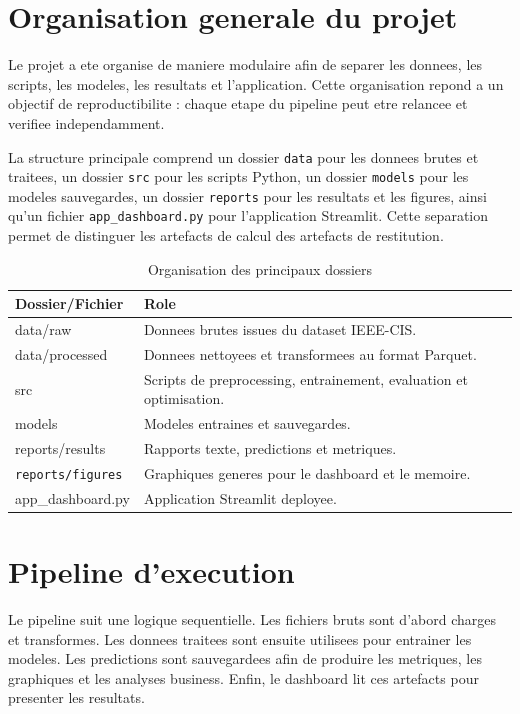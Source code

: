 ﻿\documentclass[12pt,a4paper,oneside]{report}
\begin{document}
\section{Organisation generale du projet}

Le projet a ete organise de maniere modulaire afin de separer les donnees, les scripts, les modeles, les resultats et l'application. Cette organisation repond a un objectif de reproductibilite : chaque etape du pipeline peut etre relancee et verifiee independamment.

La structure principale comprend un dossier \texttt{data} pour les donnees brutes et traitees, un dossier \texttt{src} pour les scripts Python, un dossier \texttt{models} pour les modeles sauvegardes, un dossier \texttt{reports} pour les resultats et les figures, ainsi qu'un fichier \texttt{app\_dashboard.py} pour l'application Streamlit. Cette separation permet de distinguer les artefacts de calcul des artefacts de restitution.

\begin{table}[H]
\centering
\caption{Organisation des principaux dossiers}
\begin{tabular}{p{4cm}p{10cm}}
\toprule
\textbf{Dossier/Fichier} & \textbf{Role} \\
\midrule
data/raw & Donnees brutes issues du dataset IEEE-CIS. \\
data/processed & Donnees nettoyees et transformees au format Parquet. \\
src & Scripts de preprocessing, entrainement, evaluation et optimisation. \\
models & Modeles entraines et sauvegardes. \\
reports/results & Rapports texte, predictions et metriques. \\
\texttt{reports/figures} & Graphiques generes pour le dashboard et le memoire. \\
app\_dashboard.py & Application Streamlit deployee. \\
\bottomrule
\end{tabular}
\end{table}

\section{Pipeline d'execution}

Le pipeline suit une logique sequentielle. Les fichiers bruts sont d'abord charges et transformes. Les donnees traitees sont ensuite utilisees pour entrainer les modeles. Les predictions sont sauvegardees afin de produire les metriques, les graphiques et les analyses business. Enfin, le dashboard lit ces artefacts pour presenter les resultats.
\end{document}
